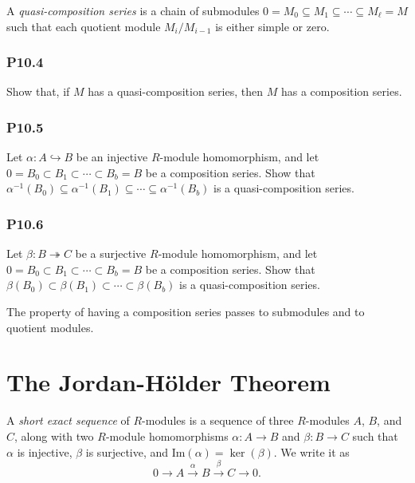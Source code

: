 \documentclass[lang=cn,11pt]{template}
\begin{document}
\begin{definition}
A \textit{quasi-composition series} is a chain of submodules \( 0 = M_0 \subseteq M_1 \subseteq \cdots \subseteq M_\ell = M \) such that each quotient module \( M_i / M_{i-1} \) is either simple or zero.
\end{definition}

\subsection*{P10.4} Show that, if \( M \) has a quasi-composition series, then \( M \) has a composition series.

\subsection*{P10.5} Let \( \alpha : A \hookrightarrow B \) be an injective \( R \)-module homomorphism, and let \( 0 = B_0 \subset B_1 \subset \cdots \subset B_b = B \) be a composition series. Show that \( \alpha^{-1}(B_0) \subseteq \alpha^{-1}(B_1) \subseteq \cdots \subseteq \alpha^{-1}(B_b) \) is a quasi-composition series.

\subsection*{P10.6} Let \( \beta : B \twoheadrightarrow C \) be a surjective \( R \)-module homomorphism, and let \( 0 = B_0 \subset B_1 \subset \cdots \subset B_b = B \) be a composition series. Show that \( \beta(B_0) \subset \beta(B_1) \subset \cdots \subset \beta(B_b) \) is a quasi-composition series.

\begin{remark}
The property of having a composition series passes to submodules and to quotient modules.
\end{remark}






\chapter{The Jordan-Hölder Theorem}

\begin{definition}
A \textit{short exact sequence} of \( R \)-modules is a sequence of three \( R \)-modules \( A \), \( B \), and \( C \), along with two \( R \)-module homomorphisms \( \alpha : A \to B \) and \( \beta : B \to C \) such that \( \alpha \) is injective, \( \beta \) is surjective, and \( \text{Im}(\alpha) = \ker(\beta) \). We write it as
\[
0 \to A \xrightarrow{\alpha} B \xrightarrow{\beta} C \to 0.
\]
\end{definition}
\end{document}
